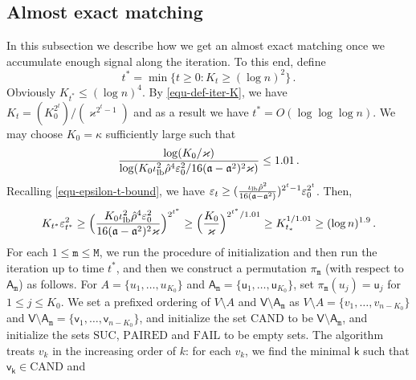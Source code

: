 \documentclass[11pt]{article}
\numberwithin{equation}{section}
\begin{document}
\subsection{Almost exact matching} \label{sec:ending-iteration}
In this subsection we describe how we get an almost exact matching once we accumulate enough signal along the iteration. To this end, define
\begin{equation}\label{eq-def-t-*}
    t^{*}=\min \{  t \geq 0: K_t \geq (\log n)^{2} \}\,.
\end{equation}
Obviously $K_{t^*} \leq (\log n)^4$. By \eqref{equ-def-iter-K}, we have $K_t = (K_0^{2^t})/ (\varkappa^{2^t-1})$ and as a result we have $t^* = O( \log \log \log n )$. We may choose $K_0 = \kappa$ sufficiently large such that
\begin{equation}
    \label{eq-kappa-choice}
    \frac{ \log ( K_0 / {\varkappa} ) }{ \log ( { K_0 \iota_{\mathrm{lb}}^2 \Hat{\rho}^{4} \varepsilon_0^2 } / { 16 (\mathfrak{a}-\mathfrak{a}^2)^2 \varkappa } ) } \leq 1.01 \,.
\end{equation} 
Recalling \eqref{equ-epsilon-t-bound}, we have $\varepsilon_t \geq (\frac{\iota_{\mathrm{lb}} \Hat{\rho}^{2}}{16 (\mathfrak{a} - \mathfrak{a}^2)})^{2^t-1} \varepsilon_0^{2^t}$. Then,
\begin{align}
    K_{t^*} \varepsilon_{t^*}^2 \geq \Big( \frac{ K_0 \iota_{\mathrm{lb}}^2 \Hat{\rho}^{4} \varepsilon^2_0 }{ 16 (\mathfrak{a}-\mathfrak{a}^2)^2 \varkappa } \Big)^{2^{t^*}} \geq \Big( \frac{K_0}{\varkappa} \Big)^{ 2^{t^*} / 1.01 } \geq K_{t_*}^{1/1.01} \geq (\log n)^{1.9} \,.
    \label{equ-K-Varepsilon-bound}
\end{align}
For each $1 \leq \mathtt m \leq \mathtt M$, we run the procedure of initialization and then run the iteration up to time $t^{*}$, and then we construct a permutation $\pi_{\mathtt{m}}$ (with respect to  $\mathsf{A}_{\mathtt{m}}$) as follows. For $A= \{ u_1, \ldots, u_{K_0}  \}$ and $\mathsf{A}_{\mathtt{m}} = \{ \mathsf{u}_1 , \ldots, \mathsf{u}_{K_0}  \}$, set $\pi_{\mathtt{m}}(u_j) = \mathsf{u}_j$ for $1 \leq j \leq K_0$. We set a prefixed ordering of $V \setminus A$ and $\mathsf{V} \setminus \mathsf{A}_{\mathtt{m}}$ as $V \setminus A = \{ v_1, \ldots, v_{n-K_0} \}$ and $\mathsf{V} \setminus \mathsf{A}_{\mathtt{m}} = \{ \mathsf{v}_1,\ldots, \mathsf{v}_{n-K_0} \} $, and initialize the set $\mathrm{CAND}$ to be $\mathsf{V} \setminus \mathsf{A}_{\mathtt{m}}$, and initialize the sets $\mathrm{SUC}$, $\mathrm{PAIRED}$ and $\mathrm{FAIL}$ to be empty sets. The algorithm treats $v_k$ in the increasing order of $k$:  for each $v_k$, we find the minimal $\mathsf{k}$ such that $\mathsf{v}_{\mathsf{k}} \in \mathrm{CAND}$ and
\end{document}
